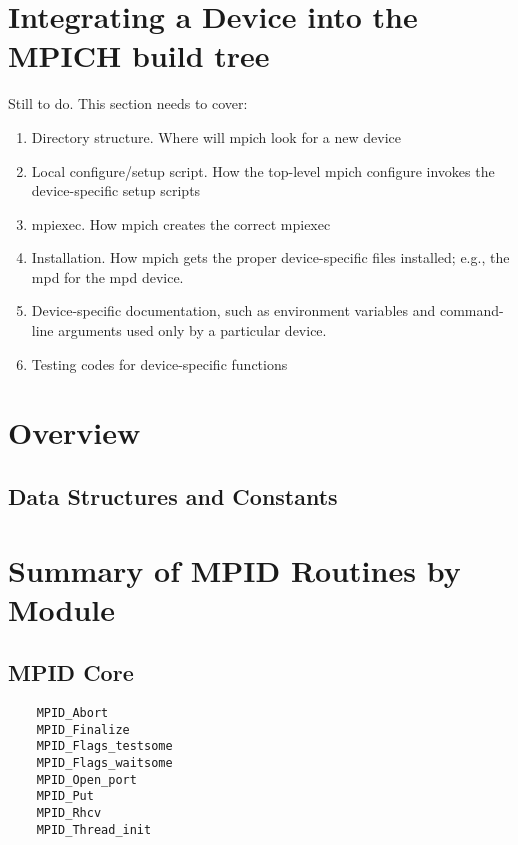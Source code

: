 \documentclass{article}
\begin{document}
%


\section{Integrating a Device into the MPICH build tree}
Still to do.  This section needs to cover:
\begin{enumerate}
\item Directory structure.  Where will mpich look for a new device
\item Local configure/setup script.  How the top-level mpich configure invokes
  the device-specific setup scripts
\item mpiexec.  How mpich creates the correct mpiexec
\item Installation.  How mpich gets the proper device-specific files
  installed; e.g., the mpd for the mpd device.
\item Device-specific documentation, such as environment variables and
  command-line arguments used only by a particular device.
\item Testing codes for device-specific functions
\end{enumerate}

\mancontentstrue

\section{Overview}



\subsection{Data Structures and Constants}




\section{Summary of MPID Routines by Module}

\subsection{MPID Core}
\begin{verbatim}
    MPID_Abort
    MPID_Finalize
    MPID_Flags_testsome
    MPID_Flags_waitsome
    MPID_Open_port
    MPID_Put
    MPID_Rhcv
    MPID_Thread_init
\end{verbatim}
\end{document}
